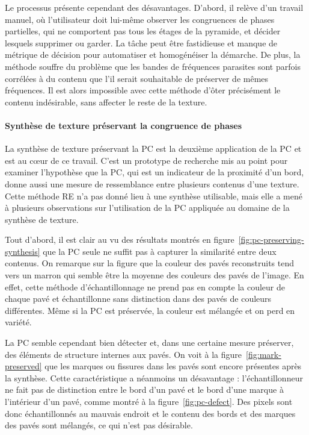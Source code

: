 \bigskip

Le processus présente cependant des désavantages. D'abord, il relève d'un travail manuel, où l'utilisateur doit lui-même observer les congruences de phases partielles, qui ne comportent pas tous les étages de la pyramide, et décider lesquels supprimer ou garder. La tâche peut être fastidieuse et manque de métrique de décision pour automatiser et homogénéiser la démarche. De plus, la méthode souffre du problème que les bandes de fréquences parasites sont parfois corrélées à du contenu que l'il serait souhaitable de préserver de mêmes fréquences. Il est alors impossible avec cette méthode d'ôter précisément le contenu indésirable, sans affecter le reste de la texture.
\paragraph{Synthèse de texture préservant la congruence de phases}
\label{par:discussion-synthesis}

La synthèse de texture préservant la PC est la deuxième application de la PC et est au cœur de ce travail. C'est un prototype de recherche mis au point pour examiner l'hypothèse que la PC, qui est un indicateur de la proximité d'un bord, donne aussi une mesure de ressemblance entre plusieurs contenus d'une texture. Cette méthode RE n'a pas donné lieu à une synthèse utilisable, mais elle a mené à plusieurs observations sur l'utilisation de la PC appliquée au domaine de la synthèse de texture.

\bigskip

Tout d'abord, il est clair au vu des résultats montrés en figure~\ref{fig:pc-preserving-synthesis} que la PC seule ne suffit pas à capturer la similarité entre deux contenus. On remarque sur la figure que la couleur des pavés reconstruits tend vers un marron qui semble être la moyenne des couleurs des pavés de l'image. En effet, cette méthode d'échantillonnage ne prend pas en compte la couleur de chaque pavé et échantillonne sans distinction dans des pavés de couleurs différentes. Même si la PC est préservée, la couleur est mélangée et on perd en variété.

\bigskip

La PC semble cependant bien détecter et, dans une certaine mesure préserver, des éléments de structure internes aux pavés. On voit à la figure~\ref{fig:mark-preserved} que les marques ou fissures dans les pavés sont encore présentes après la synthèse. Cette caractéristique a néanmoins un désavantage : l'échantillonneur ne fait pas de distinction entre le bord d'un pavé et le bord d'une marque à l'intérieur d'un pavé, comme montré à la figure~\ref{fig:pc-defect}. Des pixels sont donc échantillonnés au mauvais endroit et le contenu des bords et des marques des pavés sont mélangés, ce qui n'est pas désirable.

